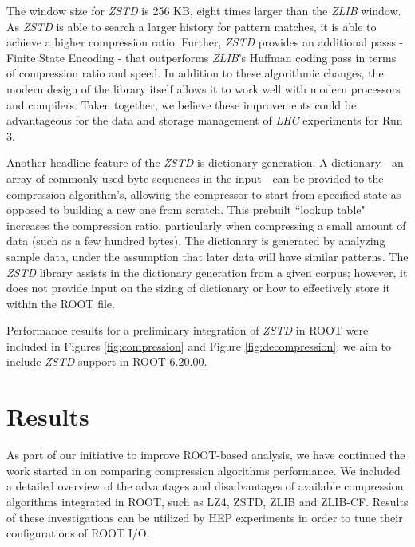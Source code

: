 \documentclass[12pt]{iopart}
\begin{document}
The window size for \textit{ZSTD} is 256 KB, eight times larger than the \textit{ZLIB} window.  As \textit{ZSTD} is able to search a larger history for pattern matches, it is able to achieve a higher compression ratio.
Further, \textit{ZSTD} provides an additional passs - Finite State Encoding - that outperforms \textit{ZLIB}'s Huffman coding pass in terms of compression ratio and speed.
In addition to these algorithmic changes, the modern design of the library itself allows it to work well with modern processors and compilers. Taken together, we believe these improvements could be advantageous for the data and storage management of \textit{LHC} experiments for Run 3.

Another headline feature of the \textit{ZSTD} is dictionary generation. A dictionary - an array of commonly-used byte sequences in the input - can be provided to the compression algorithm's, allowing the compressor to start from specified state as opposed to building a new one from scratch.  This prebuilt ``lookup table" increases the compression ratio, particularly when compressing a small amount of data (such as a few hundred bytes). The dictionary is generated by analyzing sample data, under the assumption that later data will have similar patterns.  The \textit{ZSTD} library assists in the dictionary generation from a given corpus; however, it does not provide input on the sizing of dictionary or how to effectively store it within the ROOT file.


Performance results for a preliminary integration of \textit{ZSTD} in ROOT were included in Figures \ref{fig:compression} and Figure \ref{fig:decompression}; we aim to include \textit{ZSTD} support in ROOT 6.20.00.

\section{Results}
As part of our initiative to improve ROOT-based analysis, we have continued the work started in \cite{brianzhe} on comparing compression algorithms performance. We included a detailed overview of the advantages and disadvantages of  available compression algorithms integrated in ROOT, such as LZ4, ZSTD, ZLIB and ZLIB-CF. Results of these investigations can be utilized by HEP experiments in order to tune their configurations of ROOT I/O.
\end{document}

